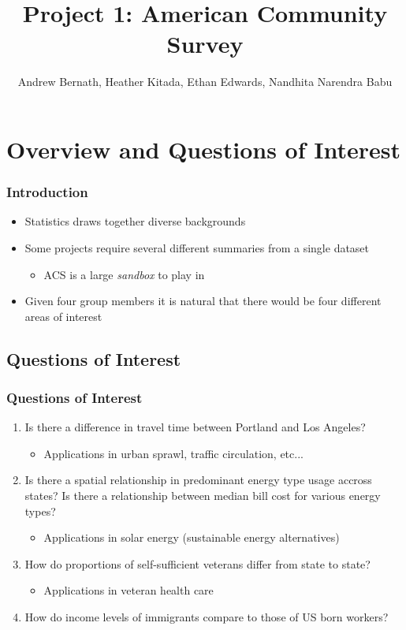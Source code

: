 \documentclass{beamer}
\title{Project 1: American Community Survey}
\author{Andrew Bernath, Heather Kitada, Ethan Edwards, Nandhita Narendra Babu}
\institute{Oregon State University}
\date
\begin{document}
\begin{frame}
\titlepage
\end{frame}

\begin{frame}{\contentsname}
\begin{multicols}{2}
\tableofcontents
\end{multicols}
\end{frame}

\section{Overview and Questions of Interest}
\begin{frame}
\frametitle{Introduction }
\begin{itemize}
\item Statistics draws together diverse backgrounds
\item Some projects require several different summaries from a single dataset
\begin{itemize}
\item ACS is a large \emph{sandbox} to play in
\end{itemize}
\item Given four group members it is natural that there would be four different areas of interest
\end{itemize}

\end{frame}

\subsection{Questions of Interest}
\begin{frame}
\frametitle{Questions of Interest }
\begin{enumerate}
\item Is there a difference in travel time between Portland and Los Angeles? 
\begin{itemize}
\item Applications in urban sprawl, traffic circulation, etc...
\end{itemize}
\item Is there a spatial relationship in predominant energy type usage accross states?  Is there a relationship between median bill cost for various energy types?
\begin{itemize}
\item Applications in solar energy (sustainable energy alternatives)
\end{itemize}
\item How do proportions of self-sufficient veterans differ from state to state?
\begin{itemize}
\item Applications in veteran health care 
\end{itemize}
\item How do income levels of immigrants compare to those of US born workers?
\end{enumerate}
\end{frame}
\end{document}
